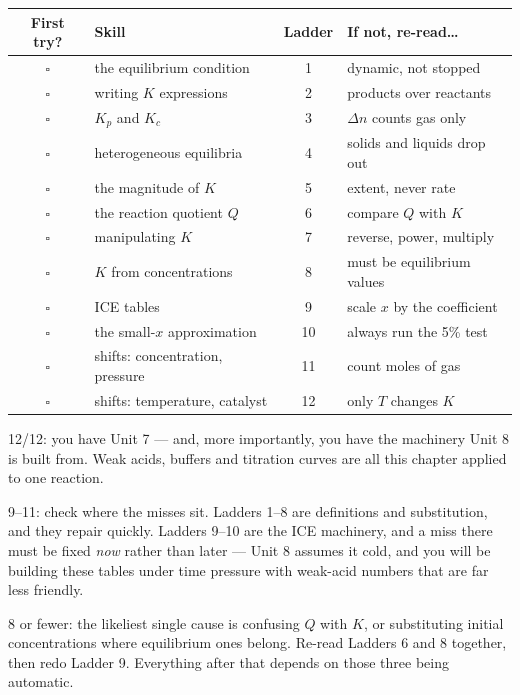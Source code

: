 \documentclass{apchem-worksheet}
\begin{document}
\renewcommand{\arraystretch}{1.3}
\noindent\begin{tabular}{@{}c p{5.9cm} c p{4.9cm}@{}}
\toprule
\textbf{First try?} & \textbf{Skill} & \textbf{Ladder} &
  \textbf{If not, re-read\ldots}\\
\midrule
$\square$ & the equilibrium condition & 1 & dynamic, not stopped \\
$\square$ & writing $K$ expressions & 2 & products over reactants \\
$\square$ & $K_{p}$ and $K_{c}$ & 3 & $\Delta n$ counts gas only \\
$\square$ & heterogeneous equilibria & 4 & solids and liquids drop out \\
$\square$ & the magnitude of $K$ & 5 & extent, never rate \\
$\square$ & the reaction quotient $Q$ & 6 & compare $Q$ with $K$ \\
$\square$ & manipulating $K$ & 7 & reverse, power, multiply \\
$\square$ & $K$ from concentrations & 8 & must be equilibrium values \\
$\square$ & ICE tables & 9 & scale $x$ by the coefficient \\
$\square$ & the small-$x$ approximation & 10 & always run the 5\% test \\
$\square$ & shifts: concentration, pressure & 11 & count moles of gas \\
$\square$ & shifts: temperature, catalyst & 12 & only $T$ changes $K$ \\
\bottomrule
\end{tabular}

\begin{apcnote}
12/12: you have Unit 7 --- and, more importantly, you have the
machinery Unit 8 is built from. Weak acids, buffers and titration curves
are all this chapter applied to one reaction.

9--11: check where the misses sit. Ladders 1--8 are definitions and
substitution, and they repair quickly. Ladders 9--10 are the ICE
machinery, and a miss there must be fixed \emph{now} rather than later
--- Unit 8 assumes it cold, and you will be building these tables under
time pressure with weak-acid numbers that are far less friendly.

8 or fewer: the likeliest single cause is confusing $Q$ with $K$, or
substituting initial concentrations where equilibrium ones belong.
Re-read Ladders 6 and 8 together, then redo Ladder 9. Everything after
that depends on those three being automatic.
\end{apcnote}
\end{document}
